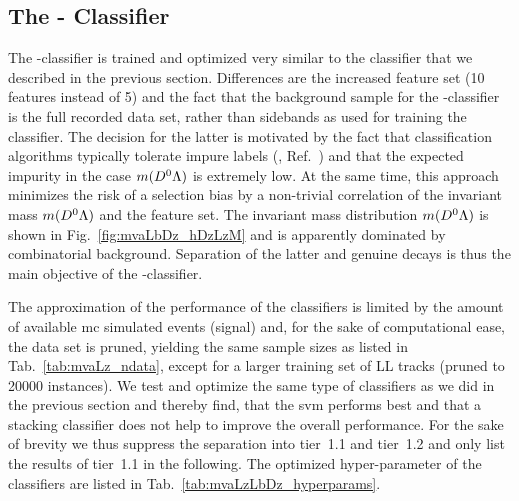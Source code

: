\subsection{The \texorpdfstring{\Lb-\Dz}{Λb-D} Classifier}
\label{sec:LbToDzLz_mvaLbDz}
The \Lb-\Dz classifier is trained and optimized very similar to the \Lz classifier that we described in the previous section.
Differences are the increased feature set (10 features instead of 5) and the fact that the background sample for the \Lb-\Dz classifier is the full recorded \decay{\Lb}{\Dz\Lz} data set, rather than sidebands as used for training the \Lz classifier.
The decision for the latter is motivated by the fact that classification algorithms typically tolerate impure labels (\eg{}, Ref.~\cite{cwola,weaklysupclass}) and that the expected impurity in the case $m({{D}^0}{\Lambda})$ is extremely low.
At the same time, this approach minimizes the risk of a selection bias by a non-trivial correlation of the invariant mass $m({{D}^0}{\Lambda})$ and the feature set.
The invariant mass distribution $m({{D}^0}{\Lambda})$ is shown in Fig.~\ref{fig:mvaLbDz_hDzLzM} and is apparently dominated by combinatorial background.
Separation of the latter and genuine \decay{\Lb}{\Dz\Lz} decays is thus the main objective of the \Lb-\Dz classifier.

The approximation of the performance of the classifiers is limited by the amount of available \gls{mc} simulated events (signal) and, for the sake of computational ease, the data set is pruned, yielding the same sample sizes as listed in Tab.~\ref{tab:mvaLz_ndata}, except for a larger training set of \gls{LL} tracks (pruned to \num{20000} instances).
We test and optimize the same type of classifiers as we did in the previous section and thereby find, that the \gls{svm} performs best and that a stacking classifier does not help to improve the overall performance.
For the sake of brevity we thus suppress the separation into tier~1.1 and tier~1.2 and only list the results of tier~1.1 in the following.
The optimized hyper-parameter of the classifiers are listed in Tab.~\ref{tab:mvaLzLbDz_hyperparams}.

